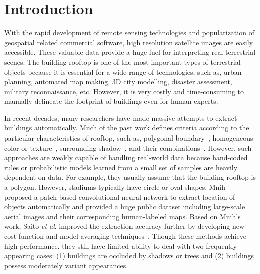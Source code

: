 \section{Introduction}
With the rapid development of remote sensing technologies and popularization of geospatial related commercial software, high resolution satellite images are easily accessible. These valuable data provide a huge fuel for interpreting real terrestrial scenes. The building rooftop is one of the most important types of terrestrial objects because it is essential for a wide range of technologies, such as, urban planning, automated map making, 3D city modelling, disaster assessment, military reconnaissance, etc. However, it is very costly and time-consuming to manually delineate the footprint of buildings even for human experts. 

In recent decades, many researchers have made massive attempts to extract buildings automatically. Much of the past work defines criteria according to the particular  characteristics of rooftop, such as, polygonal boundary~\cite{noronha2001detection,nosrati2009novel,izadi2012three,wang2015efficient}, homogeneous color or texture~\cite{cote2013automatic}, surrounding shadow~\cite{B2008Building,ok2013automated,chen2014shadow,ngoautomatic}, and their combinations~\cite{baluyan2013novel,li2015robust}. However, such approaches are weakly capable of handling real-world data because hand-coded rules or probabilistic models learned from a small set of samples are heavily dependent on data. For example, they usually assume that the building rooftop is a polygon. However, stadiums typically have circle or oval shapes. Mnih~\cite{Mnih2013Machine} proposed a patch-based convolutional neural network to extract location of objects automatically and provided a huge public dataset including large-scale aerial images and their corresponding human-labeled maps. Based on Mnih's work, Saito \textit{et al}. improved the extraction accuracy further by developing new cost function and model averaging techniques~\cite{Saito2016Multiple}. Though these methods achieve high performance, they still have limited ability to deal with two frequently appearing cases: (1) buildings are occluded by shadows or trees and (2) buildings possess moderately variant appearances. 

